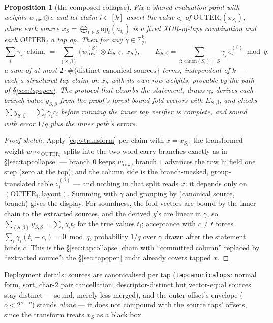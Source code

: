 \documentclass[11pt]{article}
\newcommand{\F}{\mathbb{F}}
\DeclareRobustCommand{\code}[1]{{\def\_{\textunderscore\allowbreak}\texttt{#1}}}
\theoremstyle{plain}
\newtheorem{proposition}[theorem]{Proposition}
\theoremstyle{definition}
\theoremstyle{remark}
\begin{document}
\begin{proposition}[the composed collapse]\label{prop:composed}
Fix a shared evaluation point with weights $w_{\mathrm{row}}\otimes e$
and let claim $i\in[k]$ assert the value $c_i$ of
$\mathrm{OUTER}_i(x_{S_i})$, where each source
$x_S=\bigoplus_{t\in S}\mathrm{op}_t(a_{i_t})$ is a fixed XOR-of-taps
combination and each $\mathrm{OUTER}_i$ a tap op. Then for any
$\gamma\in\F_q^{k}$,
\[
  \sum_i \gamma_i\cdot\mathrm{claim}_i
  \;=\;\sum_{(S,\beta)}
  \bigl\langle\, w_{\mathrm{row}}^{(\beta)}\otimes E_{S,\beta},\;
  x_S \,\bigr\rangle,
  \qquad
  E_{S,\beta}=\sum_{i:\,\mathrm{canon}(S_i)=S}\gamma_i\,e_i^{(\beta)}
  \bmod q,
\]
a sum of at most $2\cdot\#\{\text{distinct canonical sources}\}$
terms, independent of $k$ --- each a structured-tap claim on $x_S$
with its own row weights, provable by the path of
\S\ref{sec:tapopen}. The protocol that absorbs the statement, draws
$\gamma$, derives each branch value $y_{S,\beta}$ from the proof's
forest-bound fold vectors with $E_{S,\beta}$, and checks
$\sum y_{S,\beta}=\sum_i\gamma_i c_i$ before running the inner tap
verifier is complete, and sound with error $1/q$ plus the inner
path's errors.
\end{proposition}

\begin{proof}[Proof sketch]
Apply \eqref{eq:wtransform} per claim with $x=x_{S_i}$: the
transformed weight $w\circ\sigma_{\mathrm{OUTER}_i}$ splits into the
two word-carry branches exactly as in \S\ref{sec:tapcollapse} ---
branch $0$ keeps $w_{\mathrm{row}}$, branch $1$ advances the
$\mathrm{row\_hi}$ field one step (zero at the top), and the column
side is the branch-masked, group-translated table $e_i^{(\beta)}$ ---
and nothing in that split reads $x$: it depends only on
$(\mathrm{OUTER}_i,\text{layout})$. Summing with $\gamma$ and
grouping by (canonical source, branch) gives the display.
For soundness, the fold vectors are bound by the inner chain to the
extracted sources, and the derived $y$'s are linear in $\gamma$, so
$\sum_{(S,\beta)} y_{S,\beta}=\sum_i\gamma_i t_i$ for the true values
$t_i$; acceptance with $c\ne t$ forces
$\sum_i\gamma_i(t_i-c_i)=0\bmod q$, probability $1/q$ over $\gamma$
drawn after the statement binds $c$. This is the
\S\ref{sec:tapcollapse} chain with ``committed column'' replaced by
``extracted source''; the \S\ref{sec:tapopen} audit already covers
tapped $x$.
\end{proof}

Deployment details: sources are canonicalised per tap
(\code{tap\_canonical\_ops}: normal form, sort, char-2 pair
cancellation; descriptor-distinct but vector-equal sources stay
distinct --- sound, merely less merged), and the outer offset's
envelope ($o<2^{s-g}$) stands \emph{alone} --- it does not compound
with the source taps' offsets, since the transform treats $x_S$ as a
black box.
\end{document}
